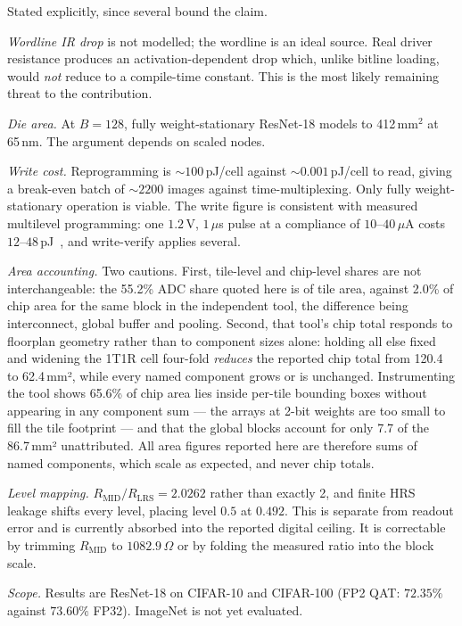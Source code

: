 \documentclass[conference,10pt]{IEEEtran}
\begin{document}
Stated explicitly, since several bound the claim.

\emph{Wordline IR drop} is not modelled; the wordline is an ideal source. Real
driver resistance produces an activation-dependent drop which, unlike bitline
loading, would \emph{not} reduce to a compile-time constant. This is the most
likely remaining threat to the contribution.

\emph{Die area.} At $B{=}128$, fully weight-stationary ResNet-18 models to
412\,mm$^2$ at 65\,nm. The argument depends on scaled nodes.

\emph{Write cost.} Reprogramming is ${\sim}100$\,pJ/cell against
${\sim}0.001$\,pJ/cell to read, giving a break-even batch of ${\sim}2200$
images against time-multiplexing. Only fully weight-stationary operation is
viable. The write figure is consistent with measured multilevel programming:
one $1.2$\,V, $1\,\mu$s pulse at a compliance of $10$--$40\,\mu$A costs
$12$--$48$\,pJ~\cite{perez2021}, and write-verify applies several.

\emph{Area accounting.} Two cautions. First, tile-level and chip-level shares
are not interchangeable: the 55.2\% ADC share quoted here is of tile area,
against 2.0\% of chip area for the same block in the independent tool, the
difference being interconnect, global buffer and pooling. Second, that tool's
chip total responds to floorplan geometry rather than to component sizes alone:
holding all else fixed and widening the 1T1R cell four-fold \emph{reduces} the
reported chip total from 120.4 to 62.4\,mm², while every named component grows
or is unchanged. Instrumenting the tool shows 65.6\% of chip area lies inside
per-tile bounding boxes without appearing in any component sum --- the arrays
at 2-bit weights are too small to fill the tile footprint --- and that the
global blocks account for only 7.7 of the 86.7\,mm² unattributed. All area figures reported here are
therefore sums of named components, which scale as expected, and never chip
totals.

\emph{Level mapping.} $R_{\mathrm{MID}}/R_{\mathrm{LRS}}{=}2.0262$ rather than
exactly 2, and finite HRS leakage shifts every level, placing level $0.5$ at
$0.492$. This is separate from readout error and is currently absorbed into the
reported digital ceiling. It is correctable by trimming $R_{\mathrm{MID}}$ to
$1082.9\,\Omega$ or by folding the measured ratio into the block scale.

\emph{Scope.} Results are ResNet-18 on CIFAR-10 and CIFAR-100 (FP2 QAT:
$72.35\%$ against $73.60\%$ FP32). ImageNet is not yet evaluated.
\end{document}
